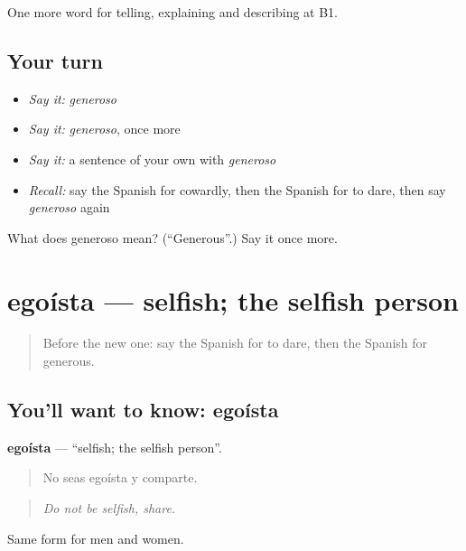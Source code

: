 \begin{grammarlens}[title={What you've built}]
One more word for telling, explaining and describing at B1.
\end{grammarlens}

\subsection*{Your turn}
\begin{itemize}
\raggedright
  \item \emph{Say it:} \emph{generoso}
  \item \emph{Say it:} \emph{generoso}, once more
  \item \emph{Say it:} a sentence of your own with \emph{generoso}
  \item \emph{Recall:} say the Spanish for cowardly, then the Spanish for to dare, then say \emph{generoso} again
\end{itemize}

\begin{tcolorbox}[breakable,colback=teal!4,colframe=teal!35!black,title={Before you move on}]
What does generoso mean? (\textquotedblleft{}Generous\textquotedblright{}.) Say it once more.
\end{tcolorbox}
\section[egoísta]{egoísta — selfish; the selfish person}

\label{lesson:ES-C723-egoista}



\begin{quote}
Before the new one: say the Spanish for to dare, then the Spanish for generous.
\end{quote}

\subsection*{You'll want to know: egoísta}
\textbf{egoísta} — \textquotedblleft{}selfish; the selfish person\textquotedblright{}.

\begin{quote}
No seas egoísta y comparte.
\end{quote}

\begin{quote}
\emph{Do not be selfish, share.}
\end{quote}

Same form for men and women.

